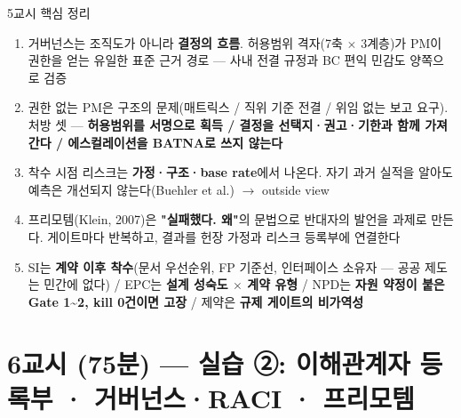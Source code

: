 \begin{frame}[allowframebreaks=1.0]{5교시 핵심 정리}
\small
\begin{enumerate}
\item\relax 거버넌스는 조직도가 아니라 \textbf{결정의 흐름}. 허용범위 격자(7축 $\times$ 3계층)가 PM이 권한을 얻는 유일한 표준 근거 경로 — 사내 전결 규정과 BC 편익 민감도 양쪽으로 검증
\item\relax 권한 없는 PM은 구조의 문제(매트릭스 / 직위 기준 전결 / 위임 없는 보고 요구). 처방 셋 — \textbf{허용범위를 서명으로 획득 / 결정을 선택지·권고·기한과 함께 가져간다 / 에스컬레이션을 BATNA로 쓰지 않는다}
\item\relax 착수 시점 리스크는 \textbf{가정·구조·base rate}에서 나온다. 자기 과거 실적을 알아도 예측은 개선되지 않는다(Buehler et al.) $\rightarrow$ outside view
\item\relax 프리모템(Klein, 2007)은 \textbf{"실패했다. 왜"}의 문법으로 반대자의 발언을 과제로 만든다. 게이트마다 반복하고, 결과를 헌장 가정과 리스크 등록부에 연결한다
\item\relax SI는 \textbf{계약 이후 착수}(문서 우선순위, FP 기준선, 인터페이스 소유자 — 공공 제도는 민간에 없다) / EPC는 \textbf{설계 성숙도 $\times$ 계약 유형} / NPD는 \textbf{자원 약정이 붙은 Gate 1\textasciitilde{}2, kill 0건이면 고장} / 제약은 \textbf{규제 게이트의 비가역성}
\end{enumerate}
\end{frame}

\section{6교시 (75분) — 실습 ②: 이해관계자 등록부 · 거버넌스·RACI · 프리모템}

